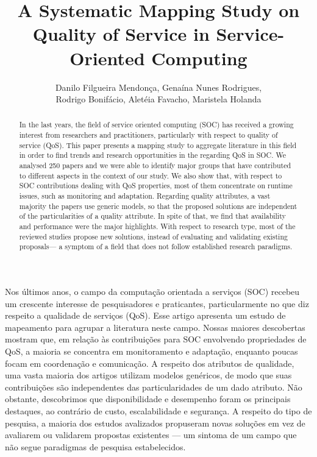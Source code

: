 \documentclass[12pt]{article}
\title{A Systematic Mapping Study on Quality of Service in Service-Oriented Computing}
\author{Danilo Filgueira Mendon\c{c}a\inst{1}, Gena\'{i}na Nunes Rodrigues\inst{1}, \\ Rodrigo Bonif\'{a}cio\inst{1}, Alet\'{e}ia Favacho\inst{1}, Maristela Holanda\inst{1} }
\begin{document}
 

\maketitle

\begin{abstract}
  In the last years, the field of service oriented computing (SOC) has received a growing interest from researchers and practitioners, particularly with respect to quality of service (QoS). This paper presents a mapping study to aggregate literature in this field in order to find trends and research opportunities in the regarding QoS in SOC. We analysed 250 papers and we were able to identify major groups that have contributed to different aspects in the context of our study. We also show that, with respect to SOC contributions dealing with QoS properties, most of them concentrate on runtime issues, such as monitoring and adaptation. Regarding quality attributes, a vast majority the papers use generic models, so that the proposed solutions are independent of the particularities of a quality attribute. In spite of that, we find that availability and performance were the major highlights. With respect to research type, most of the reviewed studies propose new solutions, instead of evaluating and validating existing proposals--- a symptom of a field that does not follow established research paradigms.
\end{abstract}

\begin{resumo}
  Nos últimos anos, o campo da computação orientada a serviços (SOC) recebeu um crescente interesse de pesquisadores e praticantes, particularmente no que diz respeito a qualidade de serviços (QoS). Esse artigo apresenta um estudo de mapeamento para agrupar a literatura neste campo. Nossas maiores descobertas mostram que, em relação às contribuições para SOC envolvendo propriedades de QoS, a maioria se concentra em monitoramento e adaptação, enquanto poucas focam em coordenação e comunicação. A respeito dos atributos de qualidade, uma vasta maioria dos artigos utilizam modelos genéricos, de modo que suas contribuições são independentes das particularidades de um dado atributo. Não obstante, descobrimos que disponibilidade e desempenho foram os principais destaques, ao contrário de custo, escalabilidade e segurança. A respeito do tipo de pesquisa, a maioria dos estudos avalizados propuseram novas soluções em vez de avaliarem ou validarem propostas existentes --- um sintoma de um campo que não segue paradigmas de pesquisa estabelecidos.
\end{resumo}




    











\end{document}
